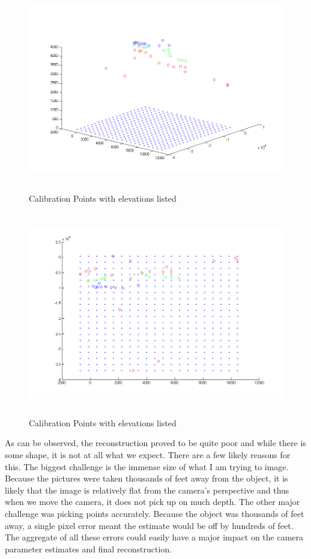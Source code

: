 \documentclass[11pt,psfig]{article}
\begin{document}
\begin{figure}[H]
\centering
\includegraphics[height=3.5in]{sfmResults1/triangulationAttempt3.png}
\caption{Calibration Points with elevations listed}
\end{figure}
\begin{figure}[H]
\centering
\includegraphics[height=3.5in]{sfmResults1/triangulationAttempt4.png}
\caption{Calibration Points with elevations listed}
\end{figure}

As can be observed, the reconstruction proved to be quite poor and while there is some shape, it is not at all what we expect. There are a few likely reasons for this. The biggest challenge is the immense size of what I am trying to image. Because the pictures were taken thousands of feet away from the object, it is likely that the image is relatively flat from the camera's perspective and thus when we move the camera, it does not pick up on much depth. The other major challenge was picking points accurately. Because the object was thousands of feet away, a single pixel error meant the estimate would be off by hundreds of feet. The aggregate of all these errors could easily have a major impact on the camera parameter estimates and final reconstruction. 
\end{document}

